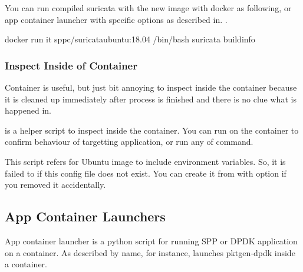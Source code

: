 \documentclass[a4paper,11pt,openany,oneside,english]{sphinxmanual}
\begin{document}
You can run compiled suricata with the new image with docker as following,
or app container launcher with specific options as described in.
{\hyperref[\detokenize{tools/sppc/app_launcher:sppc-appl-suricata}]{}}.

\begin{sphinxVerbatim}[commandchars=\\\{\},formatcom=\footnotesize]
 docker run \PYGZhy{}it sppc/suricata\PYGZhy{}ubuntu:18.04 /bin/bash
 suricata \PYGZhy{}\PYGZhy{}build\PYGZhy{}info
\end{sphinxVerbatim}


\subsubsection{Inspect Inside of Container}
\label{\detokenize{tools/sppc/build_img:inspect-inside-of-container}}\label{\detokenize{tools/sppc/build_img:sppc-build-img-inspect}}
Container is useful, but just bit annoying to inspect inside
the container because it is cleaned up immediately after process
is finished and there is no clue what is happened in.

 is a helper script to inspect inside the container.
You can run  on the container to confirm behaviour of
targetting application, or run any of command.

This script refers  for Ubuntu image  to include
environment variables.
So, it is failed to  if this config file
does not exist.
You can create it from  with  option
if you removed it accidentally.


\subsection{App Container Launchers}
\label{\detokenize{tools/sppc/app_launcher:app-container-launchers}}\label{\detokenize{tools/sppc/app_launcher:spp-container-app-launcher}}\label{\detokenize{tools/sppc/app_launcher::doc}}
App container launcher is a python script for running SPP or DPDK
application on a container.
As described by name, for instance,  launches pktgen-dpdk
inside a container.
\end{document}
